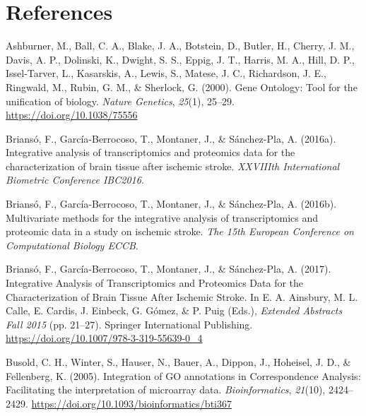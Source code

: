 \documentclass[a4paper, nobind]{templates/ociamthesis}
\newlength{\cslhangindent}
\newenvironment{CSLReferences}[2] %
 {%
  \setlength{\parindent}{0pt}
  \ifodd #1
  \let\oldpar\par
  \def\par{\hangindent=\cslhangindent\oldpar}
  \fi
  \setlength{\parskip}{1mm}
  \setlength{\baselineskip}{6mm}
 }%
 {}
\begin{document}
\hypertarget{references}{%
\chapter*{References}\label{references}}


\hypertarget{refs}{}
\begin{CSLReferences}{1}{0}
\leavevmode{}%
Ashburner, M., Ball, C. A., Blake, J. A., Botstein, D., Butler, H., Cherry, J. M., Davis, A. P., Dolinski, K., Dwight, S. S., Eppig, J. T., Harris, M. A., Hill, D. P., Issel-Tarver, L., Kasarskis, A., Lewis, S., Matese, J. C., Richardson, J. E., Ringwald, M., Rubin, G. M., \& Sherlock, G. (2000). Gene {Ontology}: Tool for the unification of biology. \emph{Nature Genetics}, \emph{25}(1), 25--29. \url{https://doi.org/10.1038/75556}

\leavevmode{}%
Briansó, F., García-Berrocoso, T., Montaner, J., \& Sánchez-Pla, A. (2016a). Integrative analysis of transcriptomics and proteomics data for the characterization of brain tissue after ischemic stroke. \emph{XXVIIIth International Biometric Conference IBC2016}.

\leavevmode{}%
Briansó, F., García-Berrocoso, T., Montaner, J., \& Sánchez-Pla, A. (2016b). Multivariate methods for the integrative analysis of transcriptomics and proteomic data in a study on ischemic stroke. \emph{The 15th European Conference on Computational Biology ECCB}.

\leavevmode{}%
Briansó, F., García-Berrocoso, T., Montaner, J., \& Sánchez-Pla, A. (2017). Integrative {Analysis} of {Transcriptomics} and {Proteomics} {Data} for the {Characterization} of {Brain} {Tissue} {After} {Ischemic} {Stroke}. In E. A. Ainsbury, M. L. Calle, E. Cardis, J. Einbeck, G. Gómez, \& P. Puig (Eds.), \emph{Extended {Abstracts} {Fall} 2015} (pp. 21--27). Springer International Publishing. \url{https://doi.org/10.1007/978-3-319-55639-0_4}

\leavevmode{}%
Busold, C. H., Winter, S., Hauser, N., Bauer, A., Dippon, J., Hoheisel, J. D., \& Fellenberg, K. (2005). Integration of {GO} annotations in {Correspondence} {Analysis}: Facilitating the interpretation of microarray data. \emph{Bioinformatics}, \emph{21}(10), 2424--2429. \url{https://doi.org/10.1093/bioinformatics/bti367}


\end{CSLReferences}
\end{document}

